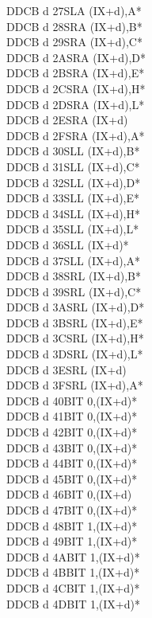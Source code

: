 \documentclass[oneside,a4paper]{book}
\begin{document}
\begin{multicols}{3}
{\begin{tabbing}
DDCB d 27\>SLA (IX+d),A*\\
DDCB d 28\>SRA (IX+d),B*\\
DDCB d 29\>SRA (IX+d),C*\\
DDCB d 2A\>SRA (IX+d),D*\\
DDCB d 2B\>SRA (IX+d),E*\\
DDCB d 2C\>SRA (IX+d),H*\\
DDCB d 2D\>SRA (IX+d),L*\\
DDCB d 2E\>SRA (IX+d)\\
DDCB d 2F\>SRA (IX+d),A*\\
DDCB d 30\>SLL (IX+d),B*\\
DDCB d 31\>SLL (IX+d),C*\\
DDCB d 32\>SLL (IX+d),D*\\
DDCB d 33\>SLL (IX+d),E*\\
DDCB d 34\>SLL (IX+d),H*\\
DDCB d 35\>SLL (IX+d),L*\\
DDCB d 36\>SLL (IX+d)*\\
DDCB d 37\>SLL (IX+d),A*\\
DDCB d 38\>SRL (IX+d),B*\\
DDCB d 39\>SRL (IX+d),C*\\
DDCB d 3A\>SRL (IX+d),D*\\
DDCB d 3B\>SRL (IX+d),E*\\
DDCB d 3C\>SRL (IX+d),H*\\
DDCB d 3D\>SRL (IX+d),L*\\
DDCB d 3E\>SRL (IX+d)\\
DDCB d 3F\>SRL (IX+d),A*\\
DDCB d 40\>BIT 0,(IX+d)*\\
DDCB d 41\>BIT 0,(IX+d)*\\
DDCB d 42\>BIT 0,(IX+d)*\\
DDCB d 43\>BIT 0,(IX+d)*\\
DDCB d 44\>BIT 0,(IX+d)*\\
DDCB d 45\>BIT 0,(IX+d)*\\
DDCB d 46\>BIT 0,(IX+d)\\
DDCB d 47\>BIT 0,(IX+d)*\\
DDCB d 48\>BIT 1,(IX+d)*\\
DDCB d 49\>BIT 1,(IX+d)*\\
DDCB d 4A\>BIT 1,(IX+d)*\\
DDCB d 4B\>BIT 1,(IX+d)*\\
DDCB d 4C\>BIT 1,(IX+d)*\\
DDCB d 4D\>BIT 1,(IX+d)*\\

\end{tabbing}}
\end{multicols}
\end{document}

